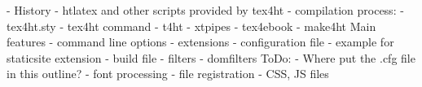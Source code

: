 - History
  - htlatex and other scripts provided by tex4ht
    - compilation process:
      - tex4ht.sty
      - tex4ht command
      - t4ht
      - xtpipes
  - tex4ebook
  - make4ht
Main features
  - command line options
  - extensions
  - configuration file
    - example for staticsite extension
  - build file
    - filters
    - domfilters
ToDo:
- Where put the .cfg file in this outline?
- font processing
- file registration - CSS, JS files

